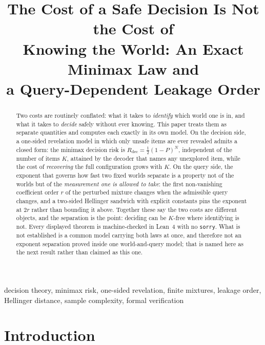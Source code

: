 \documentclass[conference]{IEEEtran}
\theoremstyle{definition}
\begin{document}
\title{The Cost of a Safe Decision Is Not the Cost of\\
Knowing the World: An Exact Minimax Law and\\
a Query-Dependent Leakage Order}

\author{
}

\maketitle

\begin{abstract}
Two costs are routinely conflated: what it takes to \emph{identify} which world one is in,
and what it takes to \emph{decide} safely without ever knowing. This paper treats them as
separate quantities and computes each exactly in its own model. On the decision side, a
one-sided revelation model in which only unsafe items are ever revealed admits a closed form:
the minimax decision risk is $R_{\mathrm{dec}}=\tfrac12(1-P)^{N}$, independent of the number
of items $K$, attained by the decoder that names any unexplored item, while the cost of
\emph{recovering} the full configuration grows with $K$. On the query side, the exponent that
governs how fast two fixed worlds separate is a property not of the worlds but of the
\emph{measurement one is allowed to take}: the first non-vanishing coefficient order $r$ of
the perturbed mixture changes when the admissible query changes, and a two-sided Hellinger
sandwich with explicit constants pins the exponent at $2r$ rather than bounding it above.
Together these say the two costs are different objects, and the separation is the point:
deciding can be $K$-free where identifying is not. Every displayed theorem is machine-checked
in Lean~4 with no \texttt{sorry}. What is not established is a common model carrying both
laws at once, and therefore not an exponent separation proved inside one world-and-query
model; that is named here as the next result rather than claimed as this one.
\end{abstract}

\begin{IEEEkeywords}
decision theory, minimax risk, one-sided revelation, finite mixtures, leakage order,
Hellinger distance, sample complexity, formal verification
\end{IEEEkeywords}

\section{Introduction}
\end{document}
